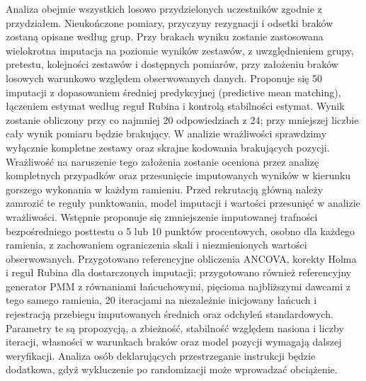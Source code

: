 \documentclass[11pt,a4paper]{article}
\begin{document}
Analiza obejmie wszystkich losowo przydzielonych uczestników zgodnie z przydziałem. Nieukończone pomiary, przyczyny rezygnacji i odsetki braków zostaną opisane według grup. Przy brakach wyniku zostanie zastosowana wielokrotna imputacja na poziomie wyników zestawów, z uwzględnieniem grupy, pretestu, kolejności zestawów i dostępnych pomiarów, przy założeniu braków losowych warunkowo względem obserwowanych danych. Proponuje się 50 imputacji z dopasowaniem średniej predykcyjnej (predictive mean matching), łączeniem estymat według reguł Rubina i kontrolą stabilności estymat. Wynik zostanie obliczony przy co najmniej 20 odpowiedziach z 24; przy mniejszej liczbie cały wynik pomiaru będzie brakujący. W analizie wrażliwości sprawdzimy wyłącznie kompletne zestawy oraz skrajne kodowania brakujących pozycji. Wrażliwość na naruszenie tego założenia zostanie oceniona przez analizę kompletnych przypadków oraz przesunięcie imputowanych wyników w kierunku gorszego wykonania w każdym ramieniu. Przed rekrutacją główną należy zamrozić te reguły punktowania, model imputacji i wartości przesunięć w analizie wrażliwości. Wstępnie proponuje się zmniejszenie imputowanej trafności bezpośredniego posttestu o 5 lub 10 punktów procentowych, osobno dla każdego ramienia, z zachowaniem ograniczenia skali i niezmienionych wartości obserwowanych. Przygotowano referencyjne obliczenia ANCOVA, korekty Holma i reguł Rubina dla dostarczonych imputacji; przygotowano również referencyjny generator PMM z równaniami łańcuchowymi, pięcioma najbliższymi dawcami z tego samego ramienia, 20 iteracjami na niezależnie inicjowany łańcuch i rejestracją przebiegu imputowanych średnich oraz odchyleń standardowych. Parametry te są propozycją, a zbieżność, stabilność względem nasiona i liczby iteracji, własności w warunkach braków oraz model pozycji wymagają dalszej weryfikacji. Analiza osób deklarujących przestrzeganie instrukcji będzie dodatkowa, gdyż wykluczenie po randomizacji może wprowadzać obciążenie.
\end{document}
